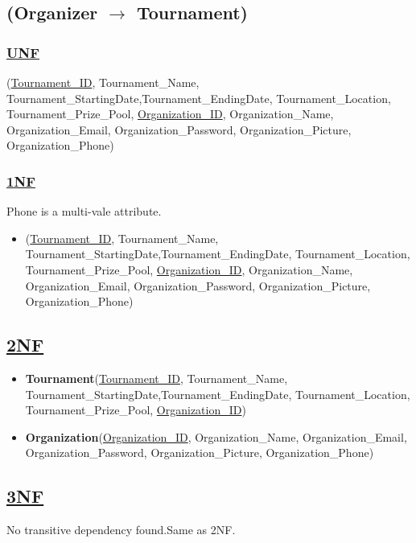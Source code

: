 \subsection{\texorpdfstring{\centering (Organizer $\rightarrow$ Tournament)}{(Organizer - Tournament)}}


\subsubsection*{\underline{UNF}}

(\underline{Tournament\_ID}, Tournament\_Name, Tournament\_StartingDate,Tournament\_EndingDate, Tournament\_Location, Tournament\_Prize\_Pool,
\underline{Organization\_ID}, Organization\_Name, Organization\_Email, Organization\_Password, Organization\_Picture, Organization\_Phone)



\subsubsection*{\underline{1NF}}
Phone is a multi-vale attribute.

\begin{itemize}
    \item (\underline{Tournament\_ID}, Tournament\_Name, Tournament\_StartingDate,Tournament\_EndingDate, Tournament\_Location, Tournament\_Prize\_Pool,
    \underline{Organization\_ID}, Organization\_Name, Organization\_Email, Organization\_Password, Organization\_Picture, Organization\_Phone)
\end{itemize}


\subsection*{\underline{2NF}}
\begin{itemize}
    \item \textbf{Tournament}(\underline{Tournament\_ID}, Tournament\_Name, Tournament\_StartingDate,Tournament\_EndingDate, Tournament\_Location, Tournament\_Prize\_Pool, \underline{Organization\_ID})
    \item \textbf{Organization}(\underline{Organization\_ID}, Organization\_Name, Organization\_Email, Organization\_Password, Organization\_Picture, Organization\_Phone)
\end{itemize}

\subsection*{\underline{3NF}}
No transitive dependency found.Same as 2NF.

